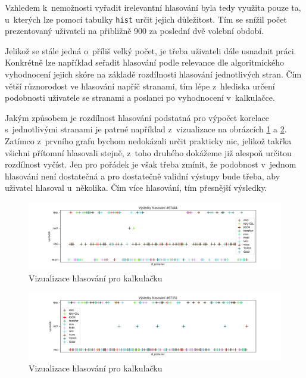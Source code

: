 \par Vzhledem k~nemožnosti vyřadit irelevantní hlasování byla tedy využita pouze ta, u~kterých lze pomocí tabulky \texttt{hist} určit jejich důležitost. Tím se snížil počet prezentovaný uživateli na přibližně 900 za poslední dvě volební období.\\ 

\par Jelikož se stále jedná o~příliš velký počet, je třeba uživateli dále usnadnit práci. Konkrétně lze například seřadit hlasování podle relevance dle algoritmického vyhodnocení jejich skóre na základě rozdílnosti hlasování jednotlivých stran. Čím větší různorodost ve hlasování napříč stranami, tím lépe z~hlediska určení podobnosti uživatele se stranami a poslanci po vyhodnocení v~kalkulačce. \\

\par Jakým způsobem je rozdílnost hlasování podstatná pro výpočet korelace s~jednotlivými stranami je patrné například z~vizualizace na obrázcích \ref{fig:analyza-rozdilne} a \ref{fig:analyza-stejne}. Zatímco z~prvního grafu bychom nedokázali určit prakticky nic, jelikož takřka všichni přítomní hlasovali stejně, z~toho druhého dokážeme již alespoň určitou rozdílnost vyčíst. Jen pro pořádek je však třeba zmínit, že podobnost v~jednom hlasování není dostatečná a pro dostatečně validní výstupy bude třeba, aby uživatel hlasoval u~několika. Čím více hlasování, tím přesnější výsledky.

\begin{figure}
    \centering
    \includegraphics[width=1\textwidth]{obrazky-figures/analyza_hl_rozdilne.png}
    \caption{Vizualizace  hlasování pro kalkulačku}
    \label{fig:analyza-rozdilne}
\end{figure}

\begin{figure}
    \centering
    \includegraphics[width=1\textwidth]{obrazky-figures/analyza_hl_stejne.png}
    \caption{Vizualizace  hlasování pro kalkulačku}
    \label{fig:analyza-stejne}
\end{figure}


